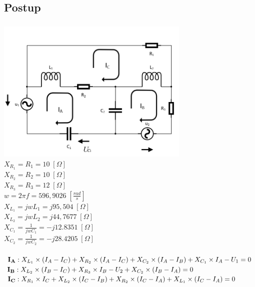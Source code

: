 \documentclass[a4paper,12pt]{article}
\begin{document}
	\subsection{Postup}
		\subsubsection{} %
			\includegraphics[width=350px]{4_1.png} \\
				\(X_{R_1} = R_1 = 10 \;[\Omega]\) \\
				\(X_{R_2} = R_2 = 10 \;[\Omega]\) \\
				\(X_{R_3} = R_3 = 12 \;[\Omega]\) \\
				\(w = 2 \pi f = 596,9026 \;[\frac{rad}{s}]\) \\
				\(X_{L_1} = jwL_1 = j95,504 \;[\Omega]\) \\
				\(X_{L_2} = jwL_2 = j44,7677 \;[\Omega]\) \\
				\(X_{C_1} = \frac{1}{jwC_1} = -j12.8351 \;[\Omega]\) \\
				\(X_{C_2} = \frac{1}{jwC_2} = -j28.4205 \;[\Omega]\) \\
			\pagebreak \\
			\begin{math}
				\mathbf{I_A:\;} X_{L_1} \times (I_A - I_C) + X_{R_2} \times (I_A - I_C) + X_{C_2} \times (I_A - I_B) + X_{C_1} \times I_A - U_1 = 0 \nonumber \\
			\end{math}
			\begin{math}
				\mathbf{I_B:\;} X_{L_2} \times (I_B - I_C) + X_{R_3} \times I_B - U_2 + X_{C_2} \times (I_B - I_A) = 0 \nonumber \\
			 \end{math}
			\begin{math}
				\mathbf{I_C:\;} X_{R_1} \times I_C + X_{L_2} \times (I_C - I_B) + X_{R_2} \times (I_C - I_A) + X_{L_1} \times (I_C - I_A) = 0 \nonumber \\
			\end{math}
\end{document}
